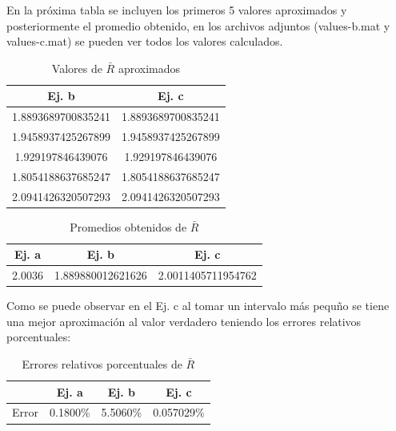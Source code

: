 \documentclass[letterpaper, 10 pt, conference]{ieeeconf}  %
\begin{document}
    En la pr\'oxima tabla se incluyen los primeros 5 valores aproximados y posteriormente el promedio obtenido, en los archivos adjuntos (values-b.mat y values-c.mat) se pueden ver todos los valores calculados.

    \begin{table}[h]
    \begin{center}
    \begin{tabular}{|c||c|}
    \hline
    Ej. b & Ej. c \\ 
    \hline
    1.8893689700835241 & 1.8893689700835241 \\ 
    \hline
    1.9458937425267899 & 1.9458937425267899 \\ 
    \hline
    1.929197846439076 & 1.929197846439076 \\ 
    \hline
    1.8054188637685247 & 1.8054188637685247 \\ 
    \hline
    2.0941426320507293 & 2.0941426320507293 \\ 
    \hline
    \end{tabular}
    \end{center}
    \caption{Valores de $\bar{R}$ aproximados}
    \label{tab:simple}
    \end{table}

    \begin{table}[h]
    \begin{center}
    \begin{tabular}{|c||c||c|}
    \hline
    Ej. a & Ej. b & Ej. c \\ 
    \hline
    2.0036 & 1.889880012621626 & 2.0011405711954762 \\
    \hline
    \end{tabular}
    \end{center}
    \caption{Promedios obtenidos de $\bar{R}$}
    \label{tab:simple}
    \end{table}

    Como se puede observar en el Ej. c al tomar un intervalo m\'as pequño se tiene una mejor aproximaci\'on al valor verdadero teniendo los errores relativos porcentuales:

    \begin{table}[h]
    \begin{center}
    \begin{tabular}{|c||c||c||c|}
    \hline
    & Ej. a & Ej. b & Ej. c \\ 
    \hline
        Error & 0.1800\% & 5.5060\% & 0.057029\% \\
    \hline
    \end{tabular}
    \end{center}
    \caption{Errores relativos porcentuales de $\bar{R}$}
    \label{tab:simple}
    \end{table}
\end{document}

